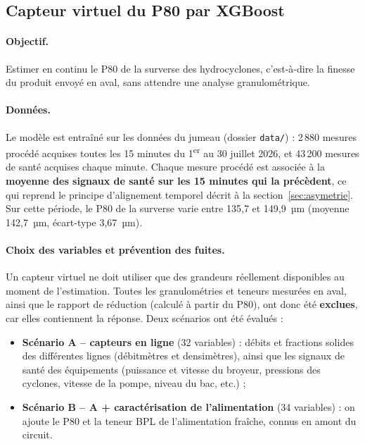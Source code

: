 \subsection{Capteur virtuel du P80 par XGBoost}
\label{sec:xgboost}

\paragraph{Objectif.} Estimer en continu le P80 de la surverse des hydrocyclones, c'est-à-dire la finesse du produit envoyé en aval, sans attendre une analyse granulométrique.

\paragraph{Données.} Le modèle est entraîné sur les données du jumeau (dossier \texttt{data/}) : 2\,880 mesures procédé acquises toutes les 15 minutes du 1\textsuperscript{er} au 30 juillet 2026, et 43\,200 mesures de santé acquises chaque minute. Chaque mesure procédé est associée à la \textbf{moyenne des signaux de santé sur les 15 minutes qui la précèdent}, ce qui reprend le principe d'alignement temporel décrit à la section~\ref{sec:asymetrie}. Sur cette période, le P80 de la surverse varie entre 135,7 et 149,9~µm (moyenne 142,7~µm, écart-type 3,67~µm).

\paragraph{Choix des variables et prévention des fuites.} Un capteur virtuel ne doit utiliser que des grandeurs réellement disponibles au moment de l'estimation. Toutes les granulométries et teneurs mesurées en aval, ainsi que le rapport de réduction (calculé à partir du P80), ont donc été \textbf{exclues}, car elles contiennent la réponse. Deux scénarios ont été évalués :
\begin{itemize}
  \item \textbf{Scénario A -- capteurs en ligne} (32 variables) : débits et fractions solides des différentes lignes (débitmètres et densimètres), ainsi que les signaux de santé des équipements (puissance et vitesse du broyeur, pressions des cyclones, vitesse de la pompe, niveau du bac, etc.) ;
  \item \textbf{Scénario B -- A + caractérisation de l'alimentation} (34 variables) : on ajoute le P80 et la teneur BPL de l'alimentation fraîche, connus en amont du circuit.
\end{itemize}


